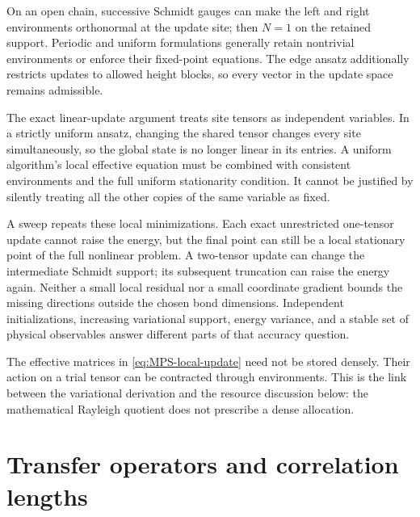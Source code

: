 On an open chain, successive Schmidt gauges can make the left and
right environments orthonormal at the update site; then $N=1$ on
the retained support. Periodic and uniform formulations generally
retain nontrivial environments or enforce their fixed-point equations.
The edge ansatz additionally restricts updates to allowed height
blocks, so every vector in the update space remains admissible.

The exact linear-update argument treats site tensors as independent
variables. In a strictly uniform ansatz, changing the shared tensor
changes every site simultaneously, so the global state is no longer
linear in its entries. A uniform algorithm's local effective equation
must be combined with consistent environments and the full uniform
stationarity condition. It cannot be justified by silently treating
all the other copies of the same variable as fixed.

A sweep repeats these local minimizations. Each exact unrestricted
one-tensor update cannot raise the energy, but the final point can
still be a local stationary point of the full nonlinear problem.
A two-tensor update can change the intermediate Schmidt support;
its subsequent truncation can raise the energy again. Neither a
small local residual nor a small coordinate gradient bounds the
missing directions outside the chosen bond dimensions. Independent
initializations, increasing variational support, energy variance,
and a stable set of physical observables answer different parts
of that accuracy question.

The effective matrices in \eqref{eq:MPS-local-update} need not be
stored densely. Their action on a trial tensor can be contracted
through environments. This is the link between the variational
derivation and the resource discussion below: the mathematical
Rayleigh quotient does not prescribe a dense allocation.

\section{Transfer operators and correlation lengths}

